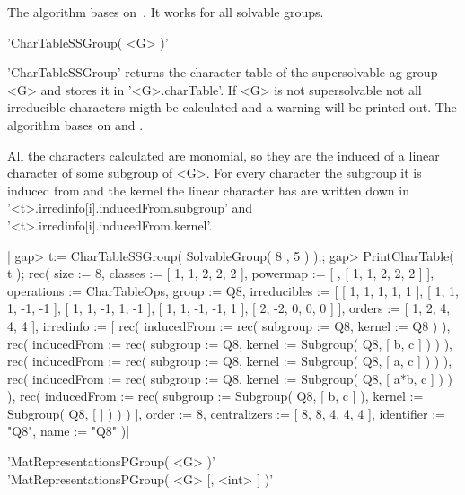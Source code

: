 The  algorithm  bases on~\cite{Con90b}. It works for all solvable groups.


'CharTableSSGroup( <G> )'

'CharTableSSGroup' returns  the  character  table  of  the  supersolvable
ag-group  <G>  and   stores   it   in  '<G>.charTable'.  If  <G>  is  not
supersolvable  not all irreducible  characters migth be calculated  and a
warning will  be  printed  out. The algorithm bases  on \cite{Con90a} and
\cite{Con90b}.

All the characters calculated are monomial, so they are the  induced of a
linear  character of  some  subgroup  of <G>.  For  every  character  the
subgroup  it is induced from and the  kernel the linear character has are
written    down     in    '<t>.irredinfo[i].inducedFrom.subgroup'     and
'<t>.irredinfo[i].inducedFrom.kernel'.

|    gap> t:= CharTableSSGroup( SolvableGroup( 8 , 5 ) );;
    gap> PrintCharTable( t );
    rec( size := 8, classes := [ 1, 1, 2, 2, 2 ], powermap :=
    [ , [ 1, 1, 2, 2, 2 ]
     ], operations := CharTableOps, group := Q8, irreducibles :=
    [ [ 1, 1, 1, 1, 1 ], [ 1, 1, 1, -1, -1 ], [ 1, 1, -1, 1, -1 ],
      [ 1, 1, -1, -1, 1 ], [ 2, -2, 0, 0, 0 ] ], orders :=
    [ 1, 2, 4, 4, 4 ], irredinfo := [ rec(
          inducedFrom := rec(
              subgroup := Q8,
              kernel := Q8 ) ), rec(
          inducedFrom := rec(
              subgroup := Q8,
              kernel := Subgroup( Q8, [ b, c ] ) ) ), rec(
          inducedFrom := rec(
              subgroup := Q8,
              kernel := Subgroup( Q8, [ a, c ] ) ) ), rec(
          inducedFrom := rec(
              subgroup := Q8,
              kernel := Subgroup( Q8, [ a*b, c ] ) ) ), rec(
          inducedFrom := rec(
              subgroup := Subgroup( Q8, [ b, c ] ),
              kernel := Subgroup( Q8, [  ] ) ) ) ], order :=
    8, centralizers := [ 8, 8, 4, 4, 4
     ], identifier := "Q8", name := "Q8" )|

%
%

'MatRepresentationsPGroup( <G> )'\\
'MatRepresentationsPGroup( <G> [, <int> ] )'


